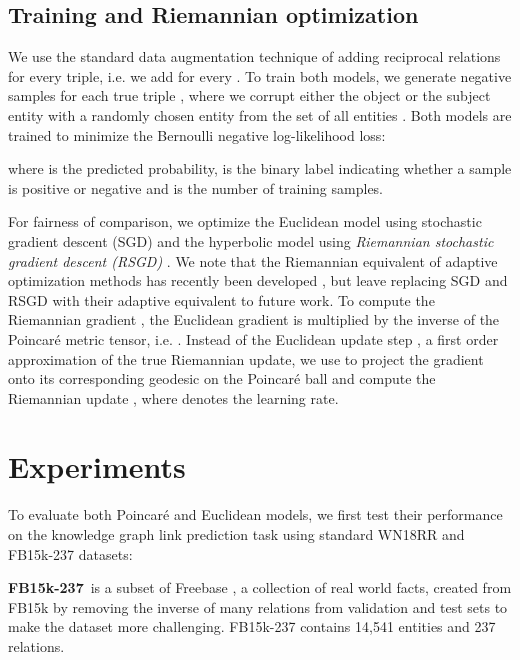 \documentclass{article}
\newcommand{\keypoint}[1]{\vspace{0.cm}\noindent\textbf{#1}\,}
\begin{document}
\subsection{Training and Riemannian optimization}

We use the standard data augmentation technique \cite{dettmers2018convolutional,lacroix2018canonical, balazevic2019tucker} of adding reciprocal relations for every triple, i.e. we add  for every . To train both models, we generate  negative samples for each true triple , where we corrupt either the object  or the subject  entity with a randomly chosen entity from the set of all entities . Both models are trained to minimize the Bernoulli negative log-likelihood loss:

where  is the predicted probability,  is the binary label indicating whether a sample is positive or negative and  is the number of training samples. 

For fairness of comparison, we optimize the Euclidean model using stochastic gradient descent (SGD) and the hyperbolic model using \textit{Riemannian stochastic gradient descent (RSGD)} \citep{bonnabel2013stochastic}. We note that the Riemannian equivalent of adaptive optimization methods has recently been developed \citep{becigneul2019riemannian}, but leave replacing SGD and RSGD with their adaptive equivalent to future work. To compute the Riemannian gradient , the Euclidean gradient  is multiplied by the inverse of the Poincar{\'e} metric tensor, i.e. .
Instead of the Euclidean update step , a first order approximation of the true Riemannian update, we use  to project the gradient  onto its corresponding geodesic on the Poincar{\'e} ball and compute the Riemannian update , where  denotes the learning rate.

\section{Experiments}

To evaluate both Poincar{\'e} and Euclidean models, we first test their performance on the knowledge graph link prediction task using standard WN18RR and FB15k-237 datasets:

\keypoint{FB15k-237} \cite{toutanova2015representing} is a subset of Freebase \cite{bollacker2008freebase}, a collection of real world facts, created from FB15k \cite{bordes2013translating} by removing the inverse of many relations from validation and test sets to make the dataset more challenging. FB15k-237 contains 14,541 entities and 237 relations.
\end{document}
